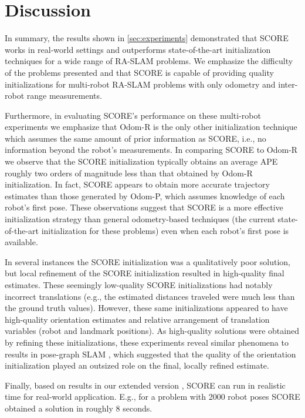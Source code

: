 \section{Discussion}

In summary, the results shown in
\cref{sec:experiments} demonstrated
that SCORE works in real-world settings and outperforms state-of-the-art
initialization techniques for a wide range of RA-SLAM problems. We emphasize
the difficulty of the problems presented and that SCORE is capable
of providing quality initializations for multi-robot RA-SLAM problems with only
odometry and inter-robot range measurements.

\MultiRobotAPEBoxPlot

Furthermore, in evaluating SCORE's performance on these multi-robot experiments
we emphasize that Odom-R is the only other initialization technique which
assumes the same amount of prior information as SCORE, i.e., no information
beyond the robot's measurements. In comparing SCORE to Odom-R we observe that
the SCORE initialization typically obtains an average APE roughly two orders of
magnitude less than that obtained by Odom-R initialization. In fact, SCORE
appears to obtain more accurate trajectory estimates than those generated by
Odom-P, which assumes knowledge of each robot's first pose. These
observations suggest that SCORE is a more effective initialization strategy than
general odometry-based techniques (the current state-of-the-art initialization
for these problems) even when each robot's first pose is
available.

In several instances the SCORE initialization was a qualitatively poor solution,
but local refinement of the SCORE initialization resulted in high-quality final
estimates. These seemingly low-quality SCORE initializations had notably
incorrect translations (e.g., the estimated distances traveled were much less
than the ground truth values). However, these same initializations appeared to
have high-quality orientation estimates and relative arrangement of translation
variables (robot and landmark positions). As high-quality solutions were
obtained by refining these initializations, these experiments reveal similar
phenomena to results in pose-graph SLAM \cite{carlone15aicra}, which suggested
that the quality of the orientation initialization played an outsized role on
the final, locally refined estimate.

Finally, based on results in our extended version
\cite{papalia2022scoreextended}, SCORE can run in realistic time for
real-world application. E.g., for a problem with 2000 robot poses SCORE obtained
a solution in roughly 8 seconds.



